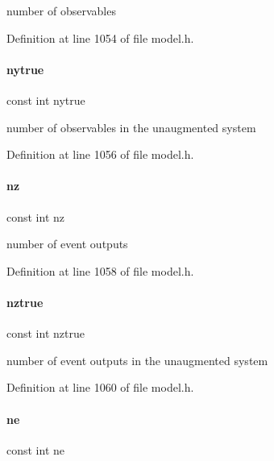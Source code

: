 number of observables 

Definition at line 1054 of file model.\+h.

\mbox{\label{classamici_1_1_model_a54bcfe56ad0df183516d096adf4e0b26}} 
\paragraph{\texorpdfstring{nytrue}{nytrue}}
{\footnotesize\ttfamily const int nytrue}

number of observables in the unaugmented system 

Definition at line 1056 of file model.\+h.

\mbox{\label{classamici_1_1_model_aa406c307f97060d218bc1fe594dfd08f}} 
\paragraph{\texorpdfstring{nz}{nz}}
{\footnotesize\ttfamily const int nz}

number of event outputs 

Definition at line 1058 of file model.\+h.

\mbox{\label{classamici_1_1_model_a9a451378ba5572ef7a3fd4dd89e1c227}} 
\paragraph{\texorpdfstring{nztrue}{nztrue}}
{\footnotesize\ttfamily const int nztrue}

number of event outputs in the unaugmented system 

Definition at line 1060 of file model.\+h.

\mbox{\label{classamici_1_1_model_a07d5274358ec39bfec473cd212a3cb78}} 
\paragraph{\texorpdfstring{ne}{ne}}
{\footnotesize\ttfamily const int ne}

